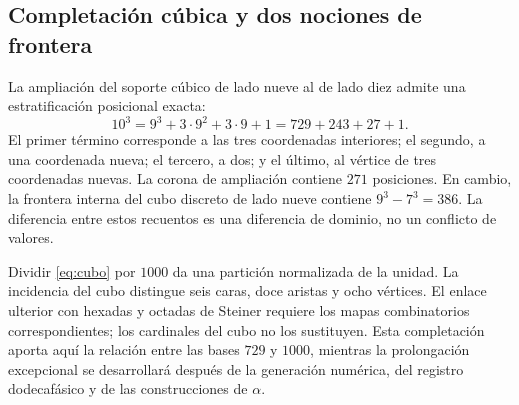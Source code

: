 \subsection{Completación cúbica y dos nociones de frontera}

La ampliación del soporte cúbico de lado nueve al de lado diez admite una estratificación posicional exacta:
\begin{equation}
 10^3=9^3+3\cdot9^2+3\cdot9+1=729+243+27+1.
 \label{eq:cubo}
\end{equation}
El primer término corresponde a las tres coordenadas interiores; el segundo, a una coordenada nueva; el tercero, a dos; y el último, al vértice de tres coordenadas nuevas. La corona de ampliación contiene \(271\) posiciones. En cambio, la frontera interna del cubo discreto de lado nueve contiene \(9^3-7^3=386\). La diferencia entre estos recuentos es una diferencia de dominio, no un conflicto de valores.

Dividir \eqref{eq:cubo} por \(1000\) da una partición normalizada de la unidad. La incidencia del cubo distingue seis caras, doce aristas y ocho vértices. El enlace ulterior con hexadas y octadas de Steiner requiere los mapas combinatorios correspondientes; los cardinales del cubo no los sustituyen. Esta completación aporta aquí la relación entre las bases \(729\) y \(1000\), mientras la prolongación excepcional se desarrollará después de la generación numérica, del registro dodecafásico y de las construcciones de \(\alpha\).





